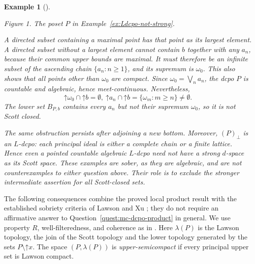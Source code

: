 \documentclass[10pt,a4paper]{amsart}
\newtheorem{example}[theorem]{Example}
\numberwithin{equation}{section}
\newcommand{\up}[1]{\mathord{\uparrow}#1}
\begin{document}
\begin{example}[{\cite[Example~58]{LawsonXuLower}}]
\begin{center}

\smallskip
\small Figure 1. The poset $P$ in Example~\ref{ex:Ldcpo-not-strong}.
\end{center}
A directed subset containing a maximal point has that point as its largest element. A directed subset without a largest element cannot contain $b$ together with any $a_n$, because their common upper bounds are maximal. It must therefore be an infinite subset of the ascending chain $\{a_n:n\ge1\}$, and its supremum is $\omega_0$. This also shows that all points other than $\omega_0$ are compact. Since $\omega_0=\bigvee_n a_n$, the dcpo $P$ is countable and algebraic, hence meet-continuous. Nevertheless,
\[
 \up\omega_0\cap\up b=\emptyset,
 ~
 \up a_n\cap\up b=\{\omega_m:m\ge n\}\ne\emptyset.
\]
The lower set $B_{P,b}$ contains every $a_n$ but not their supremum $\omega_0$, so it is not Scott closed.

The same obstruction persists after adjoining a new bottom. Moreover, $(P)_\bot$ is an $L$-dcpo: each principal ideal is either a complete chain or a finite lattice. Hence even a pointed countable algebraic $L$-dcpo need not have a strong $d$-space as its Scott space. These examples are sober, as they are algebraic, and are not counterexamples to either question above. Their role is to exclude the stronger intermediate assertion for all Scott-closed sets.
\end{example}

The following consequences combine the proved local product result with the established sobriety criteria of Lawson and Xu \cite{LawsonXu,LawsonXuLower}; they do not require an affirmative answer to Question~\ref{quest:mc-dcpo-product} in general. We use property $R$, well-filteredness, and coherence as in \cite[Sections~2 and~3]{LawsonXuLower}. Here $\lambda(P)$ is the Lawson topology, the join of the Scott topology and the lower topology generated by the sets $P\setminus\up x$. The space $(P,\lambda(P))$ is \emph{upper-semicompact} if every principal upper set is Lawson compact.
\end{document}
